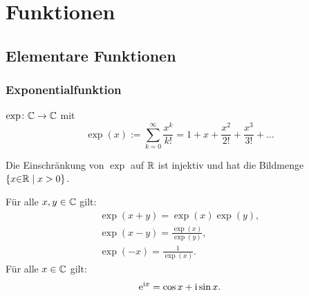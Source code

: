 
\chapter{Funktionen}
\section{Elementare Funktionen}
\subsection{Exponentialfunktion}
\begin{Definition}
$\exp\colon\mathbb C\to\mathbb C$ mit
\begin{equation}
\exp(x) := \sum_{k=0}^{\infty} \frac{x^k}{k!}
= 1+x+\frac{x^2}{2!}+\frac{x^3}{3!}+\ldots
\end{equation}
\end{Definition}
\noindent
Die Einschränkung von $\exp$ auf $\mathbb R$ ist injektiv und
hat die Bildmenge $\{x{\in}\mathbb R\mid x>0\}$.

Für alle $x,y\in\mathbb C$ gilt:
\begin{gather}
\exp(x+y) = \exp(x)\exp(y),\\
\exp(x-y) = \frac{\exp(x)}{\exp(y)},\\
\exp(-x) = \frac{1}{\exp(x)}.
\end{gather}
 Für alle $x\in\mathbb C$ gilt:
\begin{equation}
\mathrm e^{\mathrm i x} = \cos x+\mathrm i\sin x.
\end{equation}


